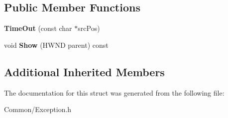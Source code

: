 \subsection*{Public Member Functions}
\begin{DoxyCompactItemize}
\item 
\mbox{\label{struct_gost_crypt_1_1_time_out_aa2eb2310135ca8696258a3f31ea61815}} 
{\bfseries Time\+Out} (const char $\ast$src\+Pos)
\item 
\mbox{\label{struct_gost_crypt_1_1_time_out_aac05acb4837ac9293ce374e3fb80f640}} 
void {\bfseries Show} (H\+W\+ND parent) const
\end{DoxyCompactItemize}
\subsection*{Additional Inherited Members}


The documentation for this struct was generated from the following file\+:\begin{DoxyCompactItemize}
\item 
Common/Exception.\+h\end{DoxyCompactItemize}
